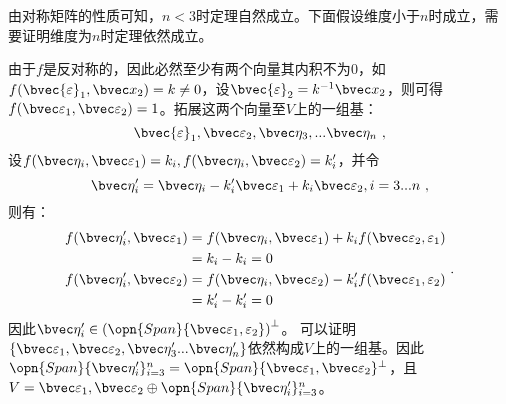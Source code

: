由对称矩阵的性质可知，$n< 3$时定理自然成立。下面假设维度小于$n$时成立，需要证明维度为$n$时定理依然成立。

由于$f$是反对称的，因此必然至少有两个向量其内积不为$0$，如$f(\bvec {\varepsilon}_1,\bvec x_2)=k\neq 0$，设$\bvec {\varepsilon}_2=k^{-1}\bvec x_2$，则可得$f(\bvec\varepsilon_1,\bvec\varepsilon_2)=1$。拓展这两个向量至$V$上的一组基：
\begin{equation}
\bvec {\varepsilon}_1,\bvec \varepsilon_2,\bvec\eta_3,...\bvec\eta_n~,
\end{equation}
设$f(\bvec \eta_i,\bvec\varepsilon_1)=k_i,f(\bvec \eta_i,\bvec\varepsilon_2)=k'_i$，并令
\begin{equation}
\bvec\eta'_i=\bvec \eta_i-k'_i\bvec\varepsilon_1+k_i\bvec\varepsilon_2,i=3...n~,
\end{equation}
则有：
\begin{equation}
\begin{aligned}
f(\bvec \eta'_i,\bvec\varepsilon_1)&=f(\bvec\eta_i,\bvec\varepsilon_1)+k_if(\bvec\varepsilon_2,\varepsilon_1)\\
&=k_i-k_i=0\\
f(\bvec \eta'_i,\bvec\varepsilon_2)&=f(\bvec\eta_i,\bvec\varepsilon_2)-k'_if(\bvec\varepsilon_1,\varepsilon_2)\\
&=k'_i-k'_i=0
\end{aligned}~.
\end{equation}
因此$\bvec \eta'_i\in \left(\opn{Span}\{\bvec\varepsilon_1,\varepsilon_2\}\right)^{\bot}$。
可以证明$\{\bvec\varepsilon_1,\bvec\varepsilon_2,\bvec\eta'_3...\bvec\eta'_n\}$依然构成$V$上的一组基。因此$\opn{Span}\{\bvec\eta'_i\}_{i=3}^n=\opn{Span}\{\bvec\varepsilon_1,\bvec \varepsilon_2\}^{\bot}$，且$V={\bvec\varepsilon_1,\bvec\varepsilon_2}\oplus \opn{Span}\{\bvec\eta'_i\}_{i=3}^n$。
